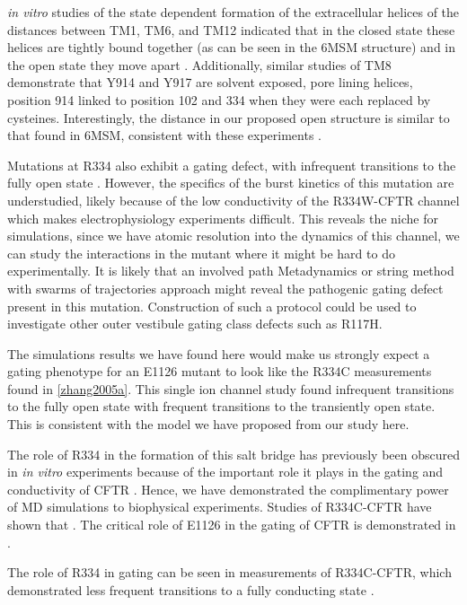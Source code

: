 \textit {in vitro} studies of the state dependent formation of the extracellular helices of the distances between  TM1, TM6, and TM12 indicated that in the closed state these helices are tightly bound together (as can be seen in the 6MSM structure) and in the open state they move apart \cite{negoda2018}. Additionally, similar studies of TM8 demonstrate that Y914 and Y917 are solvent exposed, pore lining helices, position 914 linked to position 102 and 334 when they were each replaced by cysteines. Interestingly, the distance in our proposed open structure is similar to that found in 6MSM, consistent with these experiments \cite{negoda2019}. 

Mutations at R334 also exhibit a gating defect, with infrequent transitions to the fully open state \cite{zhang2005a ,cui2013a, sheppard1993}. However, the specifics of the burst kinetics of this mutation are understudied, likely because of the low conductivity of the R334W-CFTR channel which makes electrophysiology experiments difficult. This reveals the niche for simulations, since we have atomic resolution into the dynamics of this channel, we can study the interactions in the mutant where it might be hard to do experimentally. It is likely that an involved path Metadynamics or string method with swarms of trajectories approach might reveal the pathogenic gating defect present in this mutation. Construction of such a protocol could be used to investigate other outer vestibule gating class defects such as R117H.

The simulations results we have found here would make us strongly expect a gating phenotype for an E1126 mutant to look like the R334C measurements found in \ref{zhang2005a}. This single ion channel study found infrequent transitions to the fully open state with frequent transitions to the transiently open state. This is consistent with the model we have proposed from our study here.

The role of R334 in the formation of this salt bridge has previously been obscured in \textit{in vitro} experiments because of the important role it plays in the gating and conductivity of CFTR \cite{gong2003}. Hence, we have demonstrated the complimentary power of MD simulations to biophysical experiments. Studies of R334C-CFTR have shown that \cite{zhang2005, rahman2013}. The critical role of E1126 in the gating of CFTR is demonstrated in \cite{cui2014}.

The role of R334 in gating can be seen in measurements of R334C-CFTR, which demonstrated less frequent transitions to a fully conducting state \cite{zhang2005a}.

